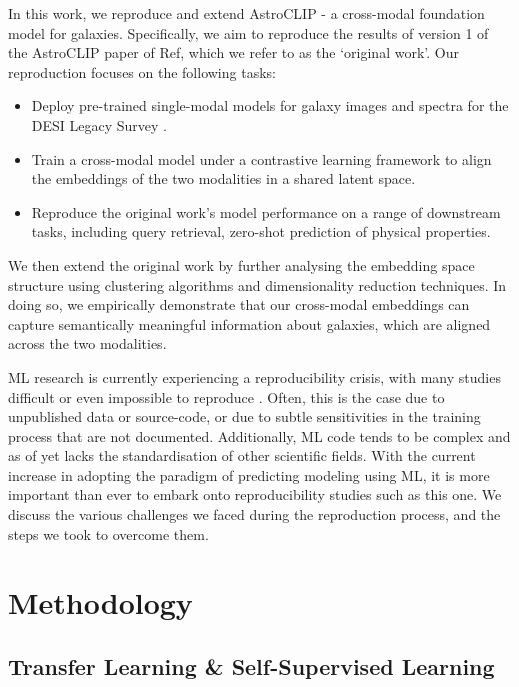 \documentclass[a4paper,12pt]{article}
\begin{document}
In this work, we reproduce and extend AstroCLIP - a cross-modal foundation model for galaxies. Specifically, we aim to reproduce the results of version 1 of the AstroCLIP paper of Ref\cite{astroclip}, which we refer to as the `original work'. Our reproduction focuses on the following tasks:
\begin{itemize}
    \item Deploy pre-trained single-modal models for galaxy images and spectra for the DESI Legacy Survey \cite{DESI}.
    \item Train a cross-modal model under a contrastive learning framework to align the embeddings of the two modalities in a shared latent space.
    \item Reproduce the original work's model performance on a range of downstream tasks, including query retrieval, zero-shot prediction of physical properties.
\end{itemize}
We then extend the original work by further analysing the embedding space structure using clustering algorithms and dimensionality reduction techniques. In doing so, we empirically demonstrate that our cross-modal embeddings can capture semantically meaningful information about galaxies, which are aligned across the two modalities.

ML research is currently experiencing a reproducibility crisis, with many studies difficult or even impossible to reproduce \cite{kapoor2023leakage}. Often, this is the case due to unpublished data or source-code, or due to subtle sensitivities in the training process that are not documented. Additionally, ML code tends to be complex and as of yet lacks the standardisation of other scientific fields. With the current increase in adopting the paradigm of predicting modeling using ML, it is more important than ever to embark onto reproducibility studies such as this one. We discuss the various challenges we faced during the reproduction process, and the steps we took to overcome them. 



\section{Methodology}
\subsection{Transfer Learning \& Self-Supervised Learning}
\end{document}
